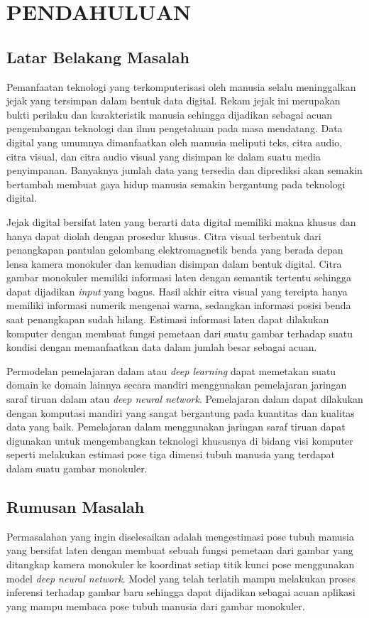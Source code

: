 
\chapter{PENDAHULUAN}
\label{cha:1-Pendahuluan}

\section{Latar Belakang Masalah}
\label{sec:1-LatarBelakangMasalah}

Pemanfaatan teknologi yang terkomputerisasi oleh manusia selalu meninggalkan jejak yang
tersimpan dalam bentuk data digital. Rekam jejak ini merupakan bukti perilaku dan karakteristik
manusia sehingga dijadikan sebagai acuan pengembangan teknologi dan ilmu pengetahuan pada masa mendatang.
Data digital yang umumnya dimanfaatkan oleh manusia meliputi teks, citra audio, citra visual, dan
citra audio visual yang disimpan ke dalam suatu media penyimpanan. Banyaknya jumlah data yang tersedia
dan diprediksi akan semakin bertambah membuat gaya hidup manusia semakin
bergantung pada teknologi digital.

Jejak digital bersifat laten yang berarti data digital memiliki makna khusus dan hanya dapat diolah
dengan prosedur khusus. Citra visual terbentuk dari penangkapan pantulan gelombang elektromagnetik
benda yang berada depan lensa kamera monokuler dan kemudian disimpan dalam bentuk digital.
Citra gambar monokuler memiliki informasi
laten dengan semantik tertentu sehingga dapat dijadikan \textit{input} yang bagus.
Hasil akhir citra visual yang tercipta hanya memiliki informasi numerik mengenai warna, sedangkan
informasi posisi benda saat penangkapan sudah hilang. Estimasi informasi laten dapat
dilakukan komputer dengan membuat fungsi pemetaan dari suatu gambar terhadap suatu kondisi dengan
memanfaatkan data dalam jumlah besar sebagai acuan.

Permodelan pemelajaran dalam atau \textit{deep learning} dapat memetakan suatu domain ke
domain lainnya secara mandiri menggunakan pemelajaran jaringan saraf tiruan dalam atau
\textit{deep neural network}. Pemelajaran dalam dapat dilakukan dengan komputasi mandiri yang
sangat bergantung pada kuantitas dan kualitas data yang baik.
Pemelajaran dalam menggunakan jaringan
saraf tiruan dapat digunakan untuk mengembangkan teknologi khususnya di bidang visi komputer
seperti melakukan estimasi pose tiga dimensi tubuh manusia yang terdapat dalam suatu gambar monokuler.

\section{Rumusan Masalah}
\label{sec:1-RumusanMasalah}
Permasalahan yang ingin diselesaikan adalah mengestimasi pose tubuh manusia yang
bersifat laten dengan membuat sebuah fungsi pemetaan dari gambar yang ditangkap kamera monokuler ke
koordinat setiap titik kunci pose menggunakan model \textit{deep neural network}.
Model yang telah terlatih mampu melakukan proses
inferensi terhadap gambar baru sehingga dapat dijadikan sebagai acuan aplikasi yang mampu membaca pose tubuh
manusia dari gambar monokuler.

